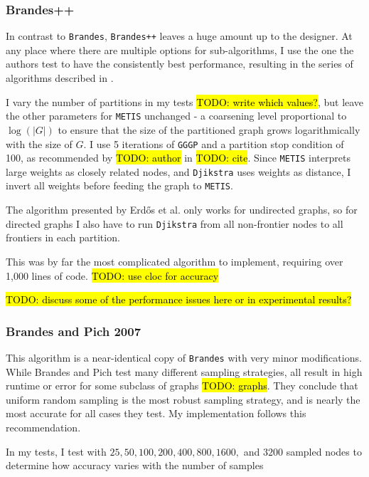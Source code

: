 \documentclass[12pt,a4paper,twoside,openright]{report}
\newcommand{\todo}[1]{\hl{TODO: #1}}
\newcommand{\ttt}[1]{\texttt{#1}}
\newcommand{\erdos}{Erd\H{o}s }
\begin{document}
			\subsubsection{Brandes++}
			
				In contrast to \ttt{Brandes}, \ttt{Brandes++} leaves a huge amount up to the designer. At any place where there are multiple options for sub-algorithms, I use the one the authors test to have the consistently best performance, resulting in the series of algorithms described in .
				
				I vary the number of partitions in my tests \todo{write which values?}, but leave the other parameters for \ttt{METIS} unchanged - a coarsening level proportional to $\log(|G|)$ to ensure that the size of the partitioned graph grows logarithmically with the size of $G$. I use 5 iterations of \ttt{GGGP} and a partition stop condition of 100, as recommended by \todo{author} in \todo{cite}. Since \ttt{METIS} interprets large weights as closely related nodes, and \ttt{Djikstra} uses weights as distance, I invert all weights before feeding the graph to \ttt{METIS}.
				
				The algorithm presented by \erdos et al. only works for undirected graphs, so for directed graphs I also have to run \ttt{Djikstra} from all non-frontier nodes to all frontiers in each partition.
				
				This was by far the most complicated algorithm to implement, requiring over 1,000 lines of code. \todo{use cloc for accuracy}
				
				\todo{discuss some of the performance issues here or in experimental results?}
			
			\subsubsection{Brandes and Pich 2007}
				This algorithm is a near-identical copy of \ttt{Brandes} with very minor modifications. While Brandes and Pich test many different sampling strategies, all result in high runtime or error for some subclass of graphs \todo{graphs}. They conclude that uniform random sampling is the most robust sampling strategy, and is nearly the most accurate for all cases they test. My implementation follows this recommendation.
				
				In my tests, I test with $25,50,100,200,400,800,1600,$ and $3200$ sampled nodes to determine how accuracy varies with the number of samples
				
\end{document}
